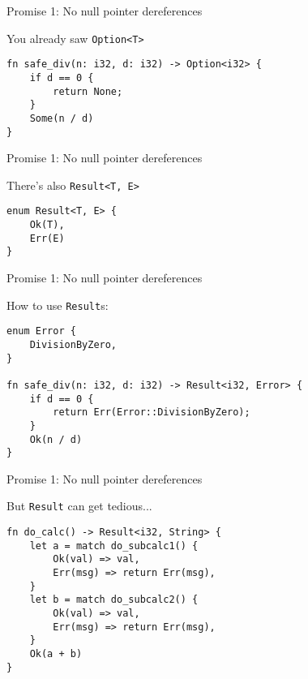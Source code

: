 \documentclass[aspectratio=1610,t]{beamer}
\begin{document}

\begin{frame}[fragile]{Promise 1: No null pointer dereferences}
\begin{block}{You already saw \texttt{Option<T>}}
\vspace{1em}
\begin{verbatim}
fn safe_div(n: i32, d: i32) -> Option<i32> {
    if d == 0 {
        return None;
    }
    Some(n / d)
}
\end{verbatim}
\end{block}
\end{frame}


\begin{frame}[fragile]{Promise 1: No null pointer dereferences}
\begin{block}{There's also \texttt{Result<T, E>}}
\vspace{1em}
\begin{verbatim}
enum Result<T, E> {
    Ok(T),
    Err(E)
}
\end{verbatim}
\end{block}
\end{frame}


\begin{frame}[fragile]{Promise 1: No null pointer dereferences}
\begin{block}{How to use \texttt{Result}s:}
\vspace{1em}
\begin{verbatim}
enum Error {
    DivisionByZero,
}

fn safe_div(n: i32, d: i32) -> Result<i32, Error> {
    if d == 0 {
        return Err(Error::DivisionByZero);
    }
    Ok(n / d)
}
\end{verbatim}
\end{block}
\end{frame}


\begin{frame}[fragile]{Promise 1: No null pointer dereferences}
\begin{block}{But \texttt{Result} can get tedious...}
\vspace{1em}
\begin{verbatim}
fn do_calc() -> Result<i32, String> {
    let a = match do_subcalc1() {
        Ok(val) => val,
        Err(msg) => return Err(msg),
    }
    let b = match do_subcalc2() {
        Ok(val) => val,
        Err(msg) => return Err(msg),
    }
    Ok(a + b)
}
\end{verbatim}
\end{block}
\end{frame}
\end{document}
